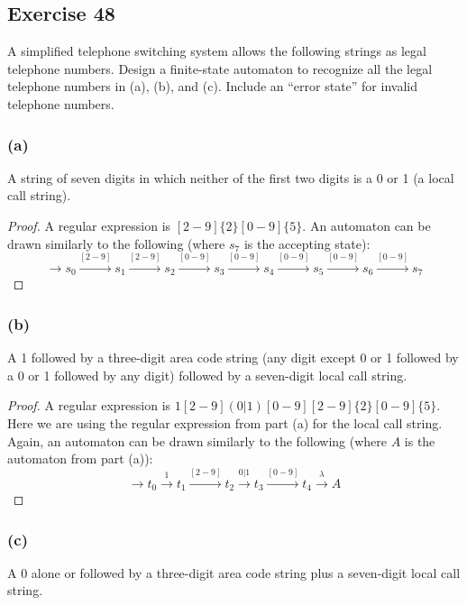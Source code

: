 \documentclass[14pt]{extarticle}
\begin{document}
\subsection{Exercise 48}
A simplified telephone switching system allows the following strings as legal telephone numbers. Design a finite-state 
automaton to recognize all the legal telephone numbers in (a), (b), and (c). Include an “error state” for invalid telephone 
numbers.

\subsubsection{(a)}
A string of seven digits in which neither of the first two digits is a 0 or 1 (a local call string).

\begin{proof}
A regular expression is \([2-9]\{2\}[0-9]\{5\}\). An automaton can be drawn similarly to the following (where \(s_7\) is the
accepting state):
\[
\to s_0 \overset{[2-9]}{\to} s_1 \overset{[2-9]}{\to} s_2 \overset{[0-9]}{\to} s_3 \overset{[0-9]}{\to} s_4 
\overset{[0-9]}{\to} s_5 \overset{[0-9]}{\to} s_6 \overset{[0-9]}{\to} s_7 
\]
\end{proof}

\subsubsection{(b)}
A 1 followed by a three-digit area code string (any digit except 0 or 1 followed by a 0 or 1 followed by any digit) 
followed by a seven-digit local call string.

\begin{proof}
A regular expression is \(1[2-9](0|1)[0-9][2-9]\{2\}[0-9]\{5\}\). Here we are using the regular expression from part (a) for 
the local call string. Again, an automaton can be drawn similarly to the following (where \(A\) is the automaton from
part (a)):
\[
\to t_0 \overset{1}{\to} t_1 \overset{[2-9]}{\to} t_2 \overset{0|1}{\to} t_3 \overset{[0-9]}{\to} t_4 
\overset{\lambda}{\to} A
\]
\end{proof}

\subsubsection{(c)}
A 0 alone or followed by a three-digit area code string plus a seven-digit local call string.
\end{document}
